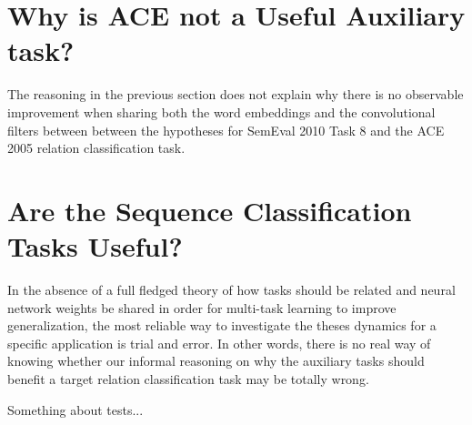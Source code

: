 \section{Why is ACE not a Useful Auxiliary task?}
The reasoning in the previous section does not explain why there is no observable improvement when sharing both the word embeddings and the convolutional filters between between the hypotheses for SemEval 2010 Task 8 and the ACE 2005 relation classification task.
\section{Are the Sequence Classification Tasks Useful?}
In the absence of a full fledged theory of how tasks should be related and neural network weights be shared in order for multi-task learning to improve generalization, the most reliable way to investigate the theses dynamics for a specific application is trial and error. In other words, there is no real way of knowing whether our informal reasoning on why the auxiliary tasks should benefit a target relation classification task may be totally wrong.

Something about tests...